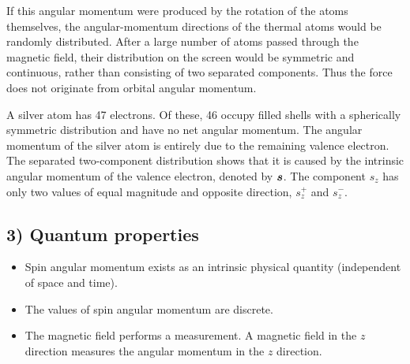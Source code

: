 If this angular momentum were produced by the rotation of the atoms themselves, the angular-momentum directions of the thermal atoms would be randomly distributed. After a large number of atoms passed through the magnetic field, their distribution on the screen would be symmetric and continuous, rather than consisting of two separated components. Thus the force does not originate from orbital angular momentum.

A silver atom has 47 electrons. Of these, 46 occupy filled shells with a spherically symmetric distribution and have no net angular momentum. The angular momentum of the silver atom is entirely due to the remaining valence electron. The separated two-component distribution shows that it is caused by the intrinsic angular momentum of the valence electron, denoted by $\bm{s}$. The component $s_z$ has only two values of equal magnitude and opposite direction, $s_z^+$ and $s_z^-$.
\subsection*{3) Quantum properties}
\begin{itemize}
\item Spin angular momentum exists as an intrinsic physical quantity (independent of space and time).
\item The values of spin angular momentum are discrete.
\item The magnetic field performs a measurement. A magnetic field in the $z$ direction measures the angular momentum in the $z$ direction.
\end{itemize}
